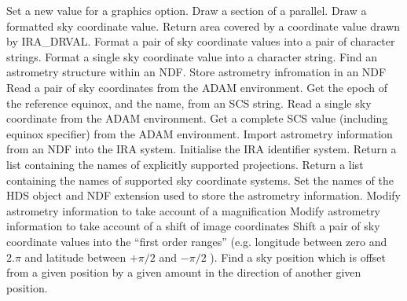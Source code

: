    {Set a new value for a graphics option.}
   {Draw a section of a parallel.}
   {Draw a formatted sky coordinate value.}
   {Return area covered by a coordinate value drawn by IRA\_DRVAL.}
   {Format a  pair of sky coordinate values into a pair of character strings.}
   {Format a  single sky coordinate value into a character string.}
   {Find an astrometry structure within an NDF.}
   {Store astrometry infromation in an NDF}
   {Read a pair of sky coordinates from the ADAM environment.}
   {Get the epoch of the reference equinox, and the name, from an SCS string.}
   {Read a single sky coordinate from the ADAM environment.}
   {Get a complete SCS value (including equinox specifier) from the ADAM 
    environment.}
   {Import astrometry information from an NDF into the IRA system.}
   {Initialise the IRA identifier system.}
   {Return a list containing the names of explicitly supported projections.}
   {Return a list containing the names of supported sky coordinate systems.}
   {Set the names of the HDS object and NDF extension used to store the 
   astrometry information.}
   {Modify astrometry information to take account of a magnification}
   {Modify astrometry information to take account of a shift of image 
coordinates}
   {Shift a pair of sky coordinate values into the ``first order ranges'' (e.g. 
   longitude between zero and $2.\pi$ and latitude between $+\pi/2$ and 
   $-\pi/2$ ).}
   {Find a sky position which is offset from a given position by a given
   amount in the direction of another given position.}
